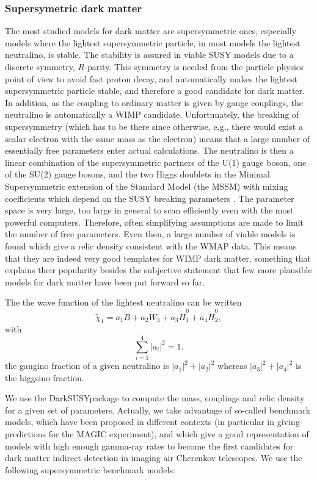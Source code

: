 \documentclass[10pt,aps,pra,reprint,amsmath,amsfonts,amssymb,showpacs]{revtex4-1}
\newcommand{\ds}{{\sc DarkSUSY}}
\begin{document}
\subsubsection{Supersymetric dark matter}
The most studied models for dark matter are supersymmetric ones,
especially models where the lightest supersymmetric particle, in most
models the lightest neutralino, is stable. The stability is assured in
viable SUSY models due to a discrete symmetry, $R$-parity. This
symmetry is needed from the particle physics point of view to avoid
fast proton decay, and automatically makes the lightest supersymmetric
particle stable, and therefore a good candidate for dark matter. In
addition, as the coupling to ordinary matter is given by gauge
couplings, the neutralino is automatically a WIMP
candidate. Unfortunately, the breaking of supersymmetry (which has to
be there since otherwise, e.g., there would exist a scalar electron
with the same mass as the electron) means that a large number of
essentially free parameters enter actual calculations.  The neutralino
is then a linear combination of the supersymmetric partners of the
U(1) gauge boson, one of the SU(2) gauge bosons, and the two Higgs
doublets in the Minimal Supersymmetric extension of the Standard Model
(the MSSM) with mixing coefficients which depend on the SUSY breaking
parameters \cite{1984NuPhB.238..453E}. The parameter space is very
large, too large in general to scan efficiently even with the most
powerful computers. Therefore, often simplifying assumptions are made
to limit the number of free parameters. Even then, a large number of
viable models is found which give a relic density consistent with the
WMAP data. This means that they are indeed very good templates for
WIMP dark matter, something that explains their popularity besides the
subjective statement that few more plausible models for dark matter
have been put forward so far.

The the wave function of the lightest neutralino can be written
$$
\tilde\chi_1=a_1\tilde B+a_2\tilde W_3+a_3 \tilde H_1^0+a_4\tilde H_2^0,
$$
with 
$$
\sum_{i=1}^4 |a_i|^2=1.
$$
the gaugino fraction of a given neutralino is $|a_1|^2+|a_2|^2$ whereas $|a_3|^2+|a_4|^2$ is the higgsino fraction. 


We use the \ds package \cite{ds} to compute the mass, couplings and
relic density for a given set of parameters.  Actually, we take
advantage of so-called benchmark models, which have been proposed in
different contexts (in particular in \cite{Bringmann:2008kj} giving
predictions for the MAGIC experiment), and which give a good
representation of models with high enough gamma-ray rates to become
the first candidates for dark matter indirect detection in imaging air
Cherenkov telescopes. We use the following supersymmetric benchmark
models:
\end{document}
